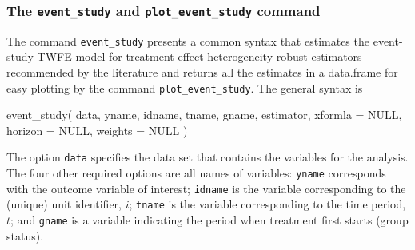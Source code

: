 \hypertarget{the-event_study-and-plot_event_study-command}{%
\subsubsection{\texorpdfstring{The \texttt{event\_study} and
\texttt{plot\_event\_study}
command}{The event\_study and plot\_event\_study command}}\label{the-event_study-and-plot_event_study-command}}

The command \texttt{event\_study} presents a common syntax that
estimates the event-study TWFE model for treatment-effect heterogeneity
robust estimators recommended by the literature and returns all the
estimates in a data.frame for easy plotting by the command
\texttt{plot\_event\_study}. The general syntax is

\begin{Schunk}
\begin{Sinput}
event_study(
    data, yname, idname, tname, gname, 
    estimator,
    xformla = NULL, horizon = NULL, weights = NULL
)
\end{Sinput}
\end{Schunk}

The option \texttt{data} specifies the data set that contains the
variables for the analysis. The four other required options are all
names of variables: \texttt{yname} corresponds with the outcome variable
of interest; \texttt{idname} is the variable corresponding to the
(unique) unit identifier, \(i\); \texttt{tname} is the variable
corresponding to the time period, \(t\); and \texttt{gname} is a
variable indicating the period when treatment first starts (group
status).

